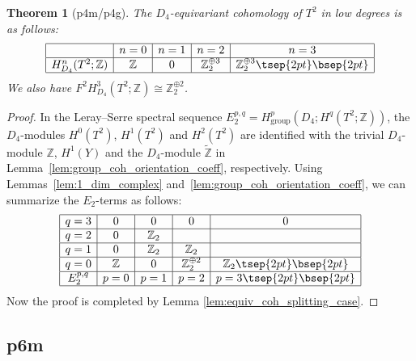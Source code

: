 \documentclass[pdftex]{sigma}
\newtheorem{thm}{Theorem}[section]
\theoremstyle{definition}
\newcommand{\Z}{\mathbb{Z}}
\begin{document}
\begin{thm}[\textsf{p4m/p4g}]
The $D_4$-equivariant cohomology of $T^2$ in low degrees is as follows:
$$
\begin{array}{|c|c|c|c|c|}
\hline
 & n = 0 & n = 1 & n = 2 & n = 3 \\
\hline
H^n_{D_4}(T^2; \Z) & \Z & 0 & \Z_2^{\oplus 3} & \Z_2^{\oplus 3} \tsep{2pt}\bsep{2pt} \\
\hline
\end{array}
$$
We also have $F^2H^3_{D_4}(T^2; \Z) \cong \Z_2^{\oplus 2}$.
\end{thm}

\begin{proof}
In the Leray--Serre spectral sequence
$E_2^{p, q} = H^p_{\mathrm{group}}(D_4; H^q(T^2; \Z))$, the $D_4$-modules $H^0(T^2)$, $H^1(T^2)$ and $H^2(T^2)$ are identif\/ied with the trivial $D_4$-module $\Z$, $H^1(Y)$ and the $D_4$-module $\tilde{\Z}$ in Lemma~\ref{lem:group_coh_orientation_coeff}, respectively. Using Lemmas~\ref{lem:1_dim_complex} and~\ref{lem:group_coh_orientation_coeff}, we can summarize the $E_2$-terms as follows:
$$
\begin{array}{|c|c|c|c|c|}
\hline
q = 3 & 0 & 0 & 0 & 0 \\
\hline
q = 2 & 0 & \Z_2 & & \\
\hline
q = 1 & 0 & \Z_2 & \Z_2 & \\
\hline
q = 0 & \Z & 0 & \Z_2^{\oplus 2} & \Z_2\tsep{2pt}\bsep{2pt} \\
\hline
E_2^{p, q} & p = 0 & p = 1 & p = 2 & p = 3 \tsep{2pt}\bsep{2pt}\\
\hline
\end{array}
$$
Now the proof is completed by Lemma \ref{lem:equiv_coh_splitting_case}.
\end{proof}

\subsection{\textsf{p6m}}\label{subsec:p6m}
\end{document}
